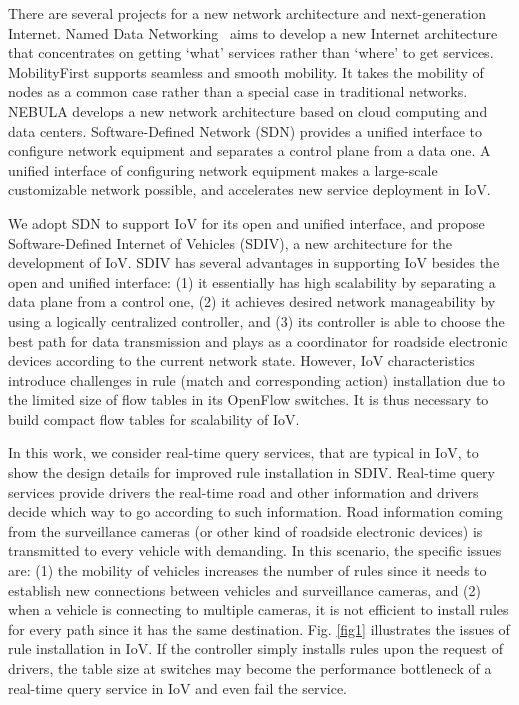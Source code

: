 \documentclass[journal]{IEEEtran}
\begin{document}
There are several projects for a new network architecture and next-generation Internet. Named Data Networking~\cite{NDN} aims to develop a new Internet architecture that concentrates on getting `what' services rather than `where' to get services. MobilityFirst \cite{MobilityFirst} supports seamless and smooth mobility. It takes the mobility of nodes as a common case rather than a special case in traditional networks. NEBULA \cite{NEBULA} develops a new network architecture based on cloud computing and data centers. Software-Defined Network (SDN) provides a unified interface to configure network equipment and separates a control plane from a data one. A unified interface of configuring network equipment makes a large-scale customizable network possible, and accelerates new service deployment in IoV.

We adopt SDN to support IoV for its open and unified interface, and propose Software-Defined Internet of Vehicles (SDIV), a new architecture for the development of IoV. SDIV has several advantages in supporting IoV besides the open and unified interface: (1) it essentially has high scalability by separating a data plane from a control one, (2) it achieves desired network manageability by using a logically centralized controller, and (3) its controller is able to choose the best path for data transmission and plays as a coordinator for roadside electronic devices according to the current network state. However, IoV characteristics introduce challenges in rule (match and corresponding action) installation due to the limited size of flow tables in its OpenFlow switches. It is thus necessary to build compact flow tables for scalability of IoV.

In this work, we consider real-time query services, that are typical in IoV, to show the design details for improved rule installation in SDIV. Real-time query services provide drivers the real-time road and other information and drivers decide which way to go according to such information. Road information coming from the surveillance cameras (or other kind of roadside electronic devices) is transmitted to every vehicle with demanding. In this scenario, the specific issues are: (1) the mobility of vehicles increases the number of rules since it needs to establish new connections between vehicles and surveillance cameras, and (2) when a vehicle is connecting to multiple cameras, it is not efficient to install rules for every path since it has the same destination. Fig. \ref{fig1} illustrates the issues of rule installation in IoV. If the controller simply installs rules upon the request of drivers, the table size at switches may become the performance bottleneck of a real-time query service in IoV and even fail the service.
\end{document}
